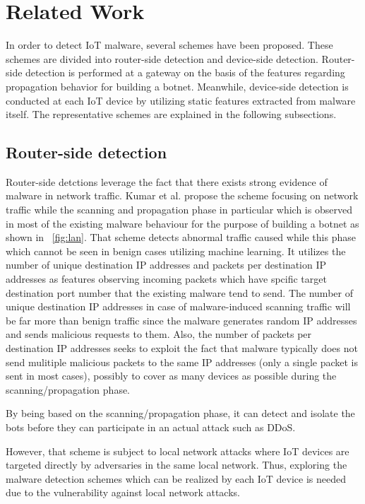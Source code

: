 \chapter{Related Work}\label{sec:related_work} 
In order to detect IoT malware, several schemes have been proposed. 
These schemes are divided into router-side detection and device-side detection.
Router-side detection is performed at a gateway on the basis of the features regarding propagation behavior for building a botnet.
Meanwhile, device-side detection is conducted at each IoT device by utilizing static features extracted from malware itself.
The representative schemes are explained in the following subsections.

\section{Router-side detection}
Router-side detctions leverage the fact that there exists strong evidence of malware in network traffic.
Kumar et al. \cite{net} propose the scheme focusing on network traffic while the scanning and propagation phase in particular which is observed in most of the existing malware behaviour for the purpose of building a botnet as shown in \figurename~\ref{fig:lan}. 
That scheme detects abnormal traffic caused while this phase which cannot be seen in benign cases utilizing machine learning.
It utilizes the number of unique destination IP addresses and packets per destination IP addresses as features observing incoming packets which have spcific target destination port number that the existing malware tend to send.
The number of unique destination IP addresses in case of malware-induced scanning traffic will be far more than benign traffic since the malware generates random IP addresses and sends malicious requests to them.
Also, the number of packets per destination IP addresses seeks to exploit the fact that malware typically does not send mulitiple malicious packets to the same IP addresses (only a single packet is sent in most cases), possibly to cover as many devices as possible during the scanning/propagation phase.

By being based on the scanning/propagation phase, it can detect and isolate the bots before they can participate in an actual attack such as DDoS.

However, that scheme is subject to local network attacks where IoT devices are targeted directly by adversaries in the same local network.
Thus, exploring the malware detection schemes which can be realized by each IoT device is needed due to the vulnerability against local network attacks.

